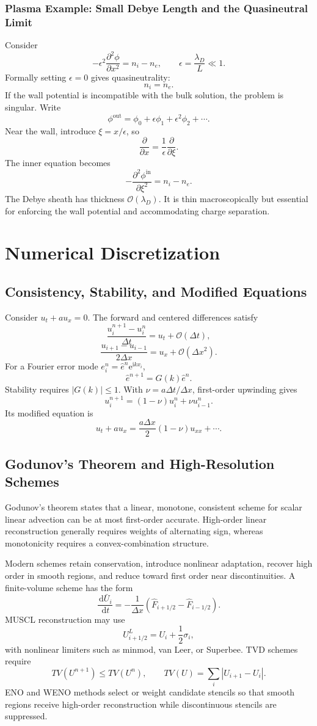 \documentclass[11pt,openany]{book}
\newcommand{\dd}{\,\mathrm d}
\newcommand{\ee}{\mathrm e}
\newcommand{\ii}{\mathrm i}
\newcommand{\Order}{\mathcal O}
\begin{document}
\section*{Plasma Example: Small Debye Length and the Quasineutral Limit}
Consider
\[
-\epsilon^2\frac{\partial^2\phi}{\partial x^2}=n_i-n_e,\qquad \epsilon=\frac{\lambda_D}{L}\ll1.
\]
Formally setting $\epsilon=0$ gives quasineutrality:
\[
n_i=n_e.
\]
If the wall potential is incompatible with the bulk solution, the problem is singular. Write
\[
\phi^{\mathrm{out}}=\phi_0+\epsilon\phi_1+\epsilon^2\phi_2+\cdots.
\]
Near the wall, introduce $\xi=x/\epsilon$, so
\[
\frac{\partial}{\partial x}=\frac{1}{\epsilon}\frac{\partial}{\partial\xi}.
\]
The inner equation becomes
\[
-\frac{\partial^2\phi^{\mathrm{in}}}{\partial\xi^2}=n_i-n_e.
\]
The Debye sheath has thickness $\Order(\lambda_D)$. It is thin macroscopically but essential for enforcing the wall potential and accommodating charge separation.

\part{Numerical Discretization}

\chapter*{Consistency, Stability, and Modified Equations}
Consider $u_t+au_x=0$. The forward and centered differences satisfy
\[
\frac{u_i^{n+1}-u_i^n}{\Delta t}=u_t+\Order(\Delta t),
\]
\[
\frac{u_{i+1}-u_{i-1}}{2\Delta x}=u_x+\Order(\Delta x^2).
\]
For a Fourier error mode $e_i^n=\widehat e^n\ee^{\ii kx_i}$,
\[
\widehat e^{n+1}=G(k)\widehat e^n.
\]
Stability requires $|G(k)|\le1$. With $\nu=a\Delta t/\Delta x$, first-order upwinding gives
\[
u_i^{n+1}=(1-\nu)u_i^n+\nu u_{i-1}^n.
\]
Its modified equation is
\[
u_t+au_x=\frac{a\Delta x}{2}(1-\nu)u_{xx}+\cdots.
\]

\chapter*{Godunov's Theorem and High-Resolution Schemes}
Godunov's theorem states that a linear, monotone, consistent scheme for scalar linear advection can be at most first-order accurate. High-order linear reconstruction generally requires weights of alternating sign, whereas monotonicity requires a convex-combination structure.

Modern schemes retain conservation, introduce nonlinear adaptation, recover high order in smooth regions, and reduce toward first order near discontinuities. A finite-volume scheme has the form
\[
\frac{\dd \bar U_i}{\dd t}=-\frac{1}{\Delta x}(\widehat F_{i+1/2}-\widehat F_{i-1/2}).
\]
MUSCL reconstruction may use
\[
U_{i+1/2}^{L}=U_i+\frac12\sigma_i,
\]
with nonlinear limiters such as minmod, van Leer, or Superbee. TVD schemes require
\[
TV(U^{n+1})\le TV(U^n),\qquad TV(U)=\sum_i|U_{i+1}-U_i|.
\]
ENO and WENO methods select or weight candidate stencils so that smooth regions receive high-order reconstruction while discontinuous stencils are suppressed.
\end{document}
